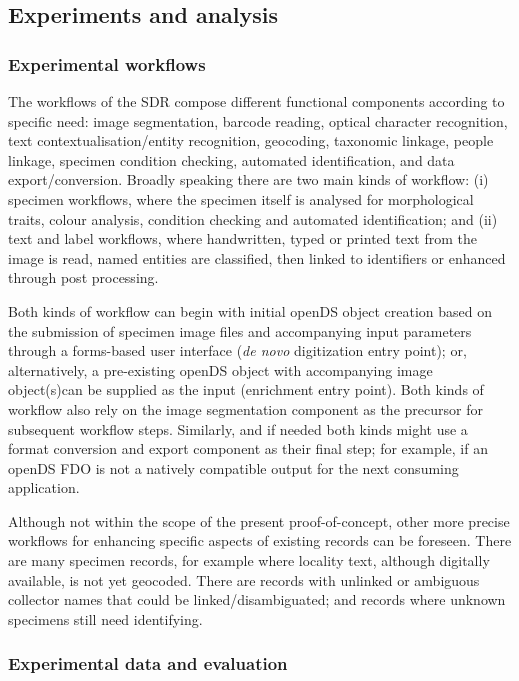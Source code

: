\subsection{Experiments and analysis}\label{experiments-and-analysis}

\subsubsection{Experimental workflows}\label{experimental-workflows}

The workflows of the SDR compose different functional components
according to specific need: image segmentation, barcode reading, optical
character recognition, text contextualisation/entity recognition,
geocoding, taxonomic linkage, people linkage, specimen condition
checking, automated identification, and data export/conversion. Broadly
speaking there are two main kinds of workflow: (i) specimen workflows,
where the specimen itself is analysed for morphological traits, colour
analysis, condition checking and automated identification; and (ii) text
and label workflows, where handwritten, typed or printed text from the
image is read, named entities are classified, then linked to identifiers
or enhanced through post processing.

Both kinds of workflow can begin with initial openDS object creation
based on the submission of specimen image files and accompanying input
parameters through a forms-based user interface (\emph{de novo}
digitization entry point); or, alternatively, a pre-existing openDS
object with accompanying image object(s)can be supplied as the input
(enrichment entry point). Both kinds of workflow also rely on the image
segmentation component as the precursor for subsequent workflow steps.
Similarly, and if needed both kinds might use a format conversion and
export component as their final step; for example, if an openDS FDO is
not a natively compatible output for the next consuming application.

Although not within the scope of the present proof-of-concept, other
more precise workflows for enhancing specific aspects of existing
records can be foreseen. There are many specimen records, for example
where locality text, although digitally available, is not yet geocoded.
There are records with unlinked or ambiguous collector names that could
be linked/disambiguated; and records where unknown specimens still need
identifying.

\subsubsection{Experimental data and evaluation}\label{experimental-data-and-evaluation}

